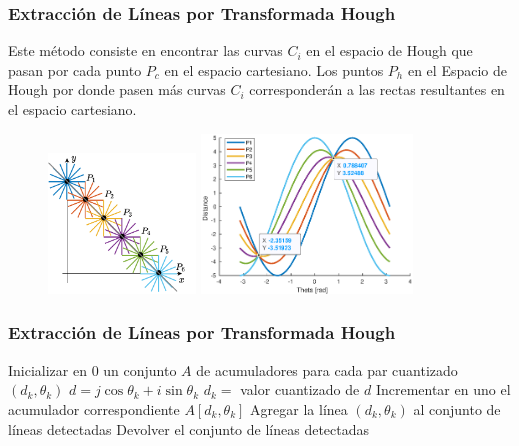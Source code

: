 \begin{frame}\frametitle{Extracción de Líneas por Transformada Hough}
  Este método consiste en encontrar las curvas $C_i$ en el espacio de Hough que pasan por cada punto $P_c$ en el espacio cartesiano. Los puntos $P_h$ en el Espacio de Hough por donde pasen más curvas $C_i$ corresponderán a las rectas resultantes en el espacio cartesiano.
  \begin{figure}
    \centering
    \includegraphics[width=0.35\textwidth]{Figures/Hough1.pdf}
    \includegraphics[width=0.5\textwidth]{Figures/Hough1.eps}
  \end{figure}
\end{frame}

\begin{frame}\frametitle{Extracción de Líneas por Transformada Hough}
  \begin{algorithm}[H]
    \DontPrintSemicolon
    \;
    Inicializar en 0 un conjunto $A$ de acumuladores para cada par cuantizado $(d_k,\theta_k)$\;
    {
      {
        $d = j\cos\theta_k + i\sin\theta_k$
        $d_k = $ valor cuantizado de $d$
        Incrementar en uno el acumulador correspondiente $A[d_k, \theta_k]$
      }
    }
    {
      {
        Agregar la línea $(d_k, \theta_k)$ al conjunto de líneas detectadas
      }
    }
    Devolver el conjunto de líneas detectadas
  \end{algorithm}
\end{frame}

